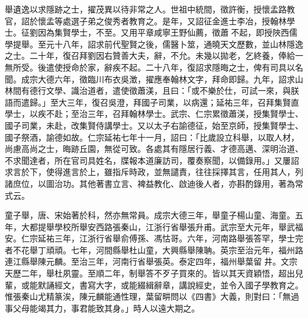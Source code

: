 \begin{pinyinscope}
 舉遺逸以求隱跡之士，擢茂異以待非常之人。世祖中統間，徵許衡，授懷孟路教官，詔於懷孟等處選子弟之俊秀者教育之。是年，又詔征金進士李冶，授翰林學士。征劉因為集賢學士，不至。又用平章咸寧王野仙薦，徵蕭不起，即授陜西儒學提舉。至元十八年，詔求前代聖賢之後，儒醫卜筮，通曉天文歷數，並山林隱逸之士。二十年，復召拜劉因右贊善大夫，辭，不允。未幾以拋老，乞終養，俸給一無所受。後遣使授命於家，辭疾不起。二十八年，復詔求隱晦之士，俾有司具以名聞。成宗大德六年，徵臨川布衣吳澂，擢應奉翰林文字，拜命即歸。九年，詔求山林間有德行文學、識治道者，遣使徵蕭渼，且曰：「或不樂於仕，可試一來，與朕語而遣歸。」至大三年，復召吳澄，拜國子司業，以病還；延祐三年，召拜集賢直學士，以疾不赴；至治三年，召拜翰林學士。武宗、仁宗累徵蕭渼，授集賢學士、國子司業，未赴，改集賢侍講學士。又以太子右諭德征，始至京師，授集賢學士、國子祭酒，諭德如故。仁宗延祐七年十一月，詔曰：「比歲設立科舉，以取人材，尚慮高尚之士，晦跡丘園，無從可致。各處其有隱居行義、才德高邁、深明治道、不求聞達者，所在官司具姓名，牒報本道廉訪司，覆奏察聞，以備錄用。」又屢詔求言於下，使得進言於上，雖指斥時政，並無譴責，往往採擇其言，任用其人，列諸庶位，以圖治功。其他著書立言、裨益教化、啟迪後人者，亦斟酌錄用，著為常式云。



 童子舉，唐、宋始著於科，然亦無常員。成宗大德三年，舉童子楊山童、海童。五年，大都提舉學校所舉安西路張秦山，江浙行省舉張升甫。武宗至大元年，舉武福安。仁宗延祐三年，江浙行省舉俞傅孫、馮怙哥。六年，河南路舉張答罕，學士完者不花舉丁頑頑。七年，河間縣舉杜山童，大興縣舉陳聃。英宗至治元年，福州路連江縣舉陳元麟。至治三年，河南行省舉張英。泰定四年，福州舉葉留井。文宗天歷二年，舉杜夙靈。至順二年，制舉答不歹子買來的。皆以其天資穎悟，超出兒輩，或能默誦經文，書寫大字，或能綴緝辭章，講說經史，並令入國子學教育之。惟張秦山尤精篆涘，陳元麟能通性理，葉留畊問以《四書》大義，則對曰：「無過事父母能竭其力，事君能致其身。」時人以遠大期之。



\end{pinyinscope}